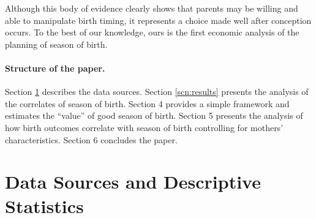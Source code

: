 \documentclass[a4paper, 12 pt]{article}
\theoremstyle{plain}
\begin{document}
\begin{doublespace}
Although this body of evidence clearly shows that parents may be willing and able to manipulate birth timing, it represents a choice made well after conception occurs. To the best of our knowledge, ours is the first economic analysis of the planning of season of birth.

\paragraph{Structure of the paper.} Section \ref{scn:data} describes the data sources. Section \ref{scn:results} presents the analysis of the correlates of season of birth. Section 4 provides a simple framework and estimates the ``value'' of good season of birth. Section 5 presents the analysis of how birth outcomes correlate with season of birth controlling for mothers' characteristics. Section 6 concludes the paper.

\newpage
\section{Data Sources and Descriptive Statistics}
\label{scn:data}

\end{doublespace}
\end{document}
